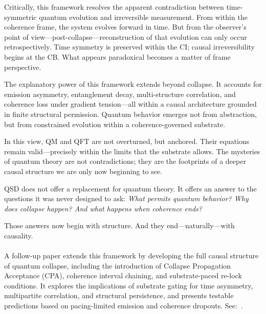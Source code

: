 \documentclass[preprints,article,submit,pdftex,moreauthors]{Definitions/mdpi}
\begin{document}
Critically, this framework resolves the apparent contradiction between time-symmetric quantum evolution and irreversible measurement. From within the coherence frame, the system evolves forward in time. But from the observer’s point of view—post-collapse—reconstruction of that evolution can only occur retrospectively. Time symmetry is preserved within the CI; causal irreversibility begins at the CB. What appears paradoxical becomes a matter of frame perspective.

The explanatory power of this framework extends beyond collapse. It accounts for emission asymmetry, entanglement decay, multi-structure correlation, and coherence loss under gradient tension—all within a causal architecture grounded in finite structural permission. Quantum behavior emerges not from abstraction, but from constrained evolution within a coherence-governed substrate.

In this view, QM and QFT are not overturned, but anchored. Their equations remain valid—precisely within the limits that the substrate allows. The mysteries of quantum theory are not contradictions; they are the footprints of a deeper causal structure we are only now beginning to see.

\smallskip

QSD does not offer a replacement for quantum theory. It offers an answer to the questions it was never designed to ask:  
\textit{What permits quantum behavior?  
Why does collapse happen?  
And what happens when coherence ends?}

Those answers now begin with structure. And they end—naturally—with causality.
\\
\smallskip
\smallskip
\\
A follow-up paper extends this framework by developing the full causal structure of quantum collapse, including the introduction of Collapse Propagation Acceptance (CPA), coherence interval chaining, and substrate-paced re-lock conditions. It explores the implications of substrate gating for time asymmetry, multipartite correlation, and structural persistence, and presents testable predictions based on pacing-limited emission and coherence dropouts. See:~\cite{bush-qmqft-ex}.



\vspace{6pt} 

\end{document}
